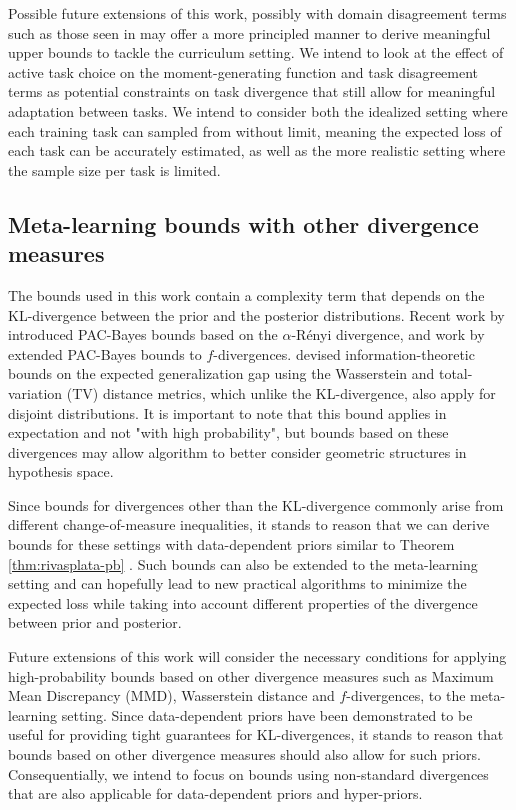 \documentclass{article}
\theoremstyle{definition}
\begin{document}
Possible future extensions of this work, possibly with domain disagreement terms such as those seen in \citet{Germain2020} may offer a more principled manner to derive meaningful upper bounds to tackle the curriculum setting. We intend to look at the effect of active task choice on the moment-generating function and task disagreement terms as potential constraints on task divergence that still allow for meaningful adaptation between tasks. We intend to consider both the idealized setting where each training task can sampled from without limit, meaning the expected loss of each task can be accurately estimated, as well as the more realistic setting where the sample size per task is limited.

\subsection{Meta-learning bounds with other divergence measures}

The bounds used in this work contain a complexity term that depends on the KL-divergence between the prior and the posterior distributions. Recent work by \citet{Begin2016} introduced PAC-Bayes bounds based on the $\alpha$-R\'{e}nyi divergence, and work by \citet{Ohnishi2020} extended PAC-Bayes bounds to $f$-divergences. \citet{Lugosi2022} devised information-theoretic bounds on the expected generalization gap using the Wasserstein and total-variation (TV) distance metrics, which unlike the KL-divergence, also apply for disjoint distributions. It is important to note that this bound applies in expectation and not "with high probability", but bounds based on these divergences may allow algorithm to better consider geometric structures in hypothesis space.

Since bounds for divergences other than the KL-divergence commonly arise from different change-of-measure inequalities, it stands to reason that we can derive bounds for these settings with data-dependent priors similar to Theorem \ref{thm:rivasplata-pb} \citep{Rivasplata2020}. Such bounds can also be extended to the meta-learning setting and can hopefully lead to new practical algorithms to minimize the expected loss while taking into account different properties of the divergence between prior and posterior.

Future extensions of this work will consider the necessary conditions for applying high-probability bounds based on other divergence measures such as Maximum Mean Discrepancy (MMD), Wasserstein distance and $f$-divergences, to the meta-learning setting. 
Since data-dependent priors have been demonstrated \citep{Dziugaite2017, Perez-Ortiz2021} to be useful for providing tight guarantees for KL-divergences, it stands to reason that bounds based on other divergence measures should also allow for such priors.
Consequentially, we intend to focus on bounds using non-standard divergences that are also applicable for data-dependent priors and hyper-priors.
\end{document}
